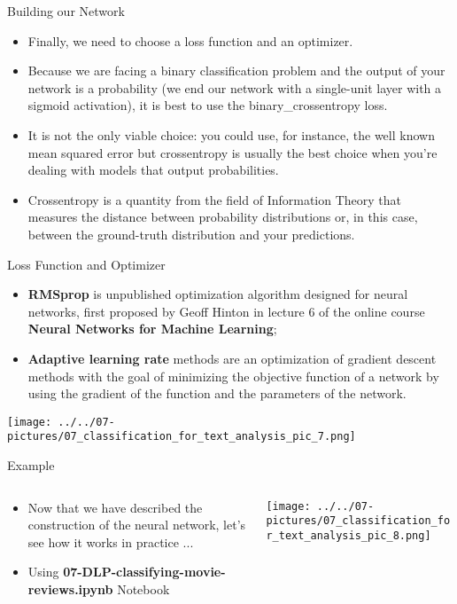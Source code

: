 \documentclass[11pt]{beamer}
\begin{document}
\begin{frame}{Building our Network}
	\begin{itemize}
		\item Finally, we need to choose a loss function and an optimizer. 
		\item Because we are facing a binary classification problem and the output of your network is a probability (we end our network with a single-unit layer with a sigmoid activation), it is best to use the binary\_crossentropy loss. 
		\item It is not the only viable choice: you could use, for instance, the well known mean squared error but crossentropy is usually the best choice when you're dealing with models that output probabilities. 
		\item Crossentropy is a quantity from the field of Information Theory that measures the distance between probability distributions or, in this case, between the ground-truth distribution and your predictions.
	\end{itemize}
\end{frame}
\begin{frame}{Loss Function and Optimizer}
	\begin{itemize}
		\item \textbf{RMSprop} is unpublished optimization algorithm designed for neural networks, first proposed by Geoff Hinton in lecture 6 of the online course \textbf{Neural Networks for Machine Learning};
		\item \textbf{Adaptive learning rate} methods are an optimization of gradient descent methods with the goal of minimizing the objective function of a network by using the gradient of the function and the parameters of the network.
	\end{itemize}
	\begin{center}
	\texttt{[image: ../../07-pictures/07\_classification\_for\_text\_analysis\_pic\_7.png]}
	\end{center}
\end{frame}
\begin{frame}{Example}
\begin{columns}[T] %
\begin{column}{.48\textwidth}
        \begin{itemize}
		\item Now that we have described the construction of the neural network, let's see how it works in practice ...
		\item Using \textbf{07-DLP-classifying-movie-reviews.ipynb} Notebook 
        \end{itemize}
\end{column}%
\hfill%
\begin{column}{.48\textwidth}
        \texttt{[image: ../../07-pictures/07\_classification\_for\_text\_analysis\_pic\_8.png]}
\end{column}%
\end{columns}
\end{frame}
\end{document}

